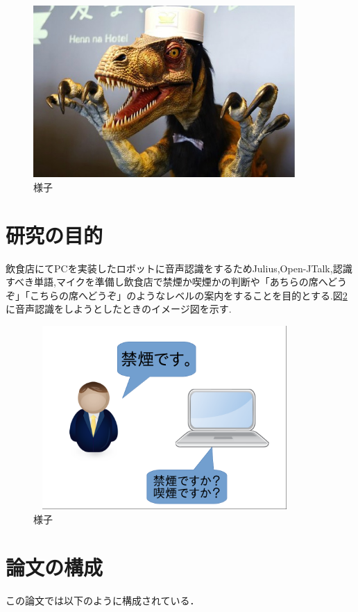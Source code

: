 \documentclass[12pt,oneside]{sotsuken_paper}
\begin{document}
\begin{figure}[htbp]
\begin{center}
\includegraphics[width=100mm]{img/huistenbosch.jpg}
\caption{様子}
\label{fig:huistenbosch}
\end{center}
\end{figure}


\section{研究の目的}
飲食店にてPCを実装したロボットに音声認識をするためJulius,Open-JTalk,認識すべき単語,マイクを準備し飲食店で禁煙か喫煙かの判断や「あちらの席へどうぞ」「こちらの席へどうぞ」のようなレベルの案内をすることを目的とする.図\ref{fig:yousu}に音声認識をしようとしたときのイメージ図を示す.
\begin{figure}[htbp]
\begin{center}
\includegraphics[width=100mm,height=70mm]{img/Image.png}
\caption{様子}
\label{fig:yousu}
\end{center}
\end{figure}
\section{論文の構成}
この論文では以下のように構成されている．
\end{document}

